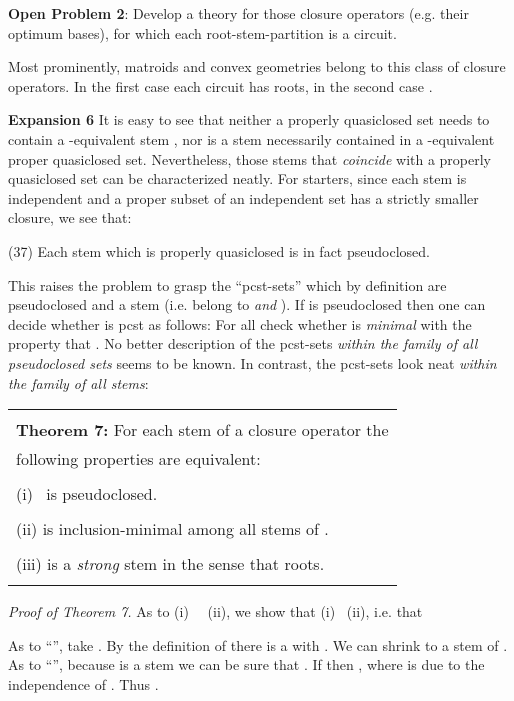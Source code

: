 \documentclass[11pt]{article}
\begin{document}
{\bf Open Problem 2}: Develop a theory for those closure operators (e.g. their optimum bases), for which each root-stem-partition  is a circuit.

Most prominently, matroids and convex geometries belong to this class of closure operators. In the first case each circuit  has roots, in the second case .



{\bf Expansion 6} It is easy to see that neither a properly quasiclosed set  needs to contain a -equivalent stem , nor is a stem  necessarily contained in a -equivalent proper quasiclosed set. Nevertheless, those stems  that {\it coincide} with a properly quasiclosed set can be characterized neatly. For starters, since each stem  is independent and a proper subset of an independent set has a strictly smaller closure, we see that:

(37) \quad Each stem which is properly quasiclosed is in fact pseudoclosed.

This raises the problem to grasp the ``pcst-sets'' which by definition are pseudoclosed and a stem (i.e. belong to  {\it and} ). If  is pseudoclosed then one can decide whether  is pcst as follows: For all  check whether  is {\it minimal} with the property that . No better description of the pcst-sets {\it within the family of all pseudoclosed sets} seems to be known. In contrast, the pcst-sets look neat {\it within the family of all stems}:

\begin{tabular}{|l|} \hline \\
{\bf Theorem 7:} For each stem  of a closure operator  the \\
following properties are equivalent:\\
\\
(i) \  is pseudoclosed.\\
\\
(ii)  is inclusion-minimal among all stems of .\\
\\
(iii)  is a {\it strong} stem in the sense that roots.\\ \\ \hline \end{tabular}


{\it Proof of Theorem 7.}
As to (i) \  \ (ii), we show that (i) \ (ii), i.e. that

As to ``'', take . By the definition of  there is a  with . We can shrink  to a stem  of . As to ``'', because  is a stem we can be sure that . If  then , where  is due to the independence of . Thus .
\end{document}
